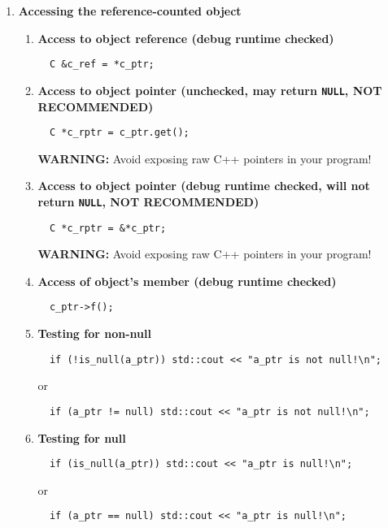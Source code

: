 \documentclass[pdf,ps2pdf,11pt]{SANDreport}
\begin{document}
\begin{enumerate}
\item {\bf Accessing the reference-counted object}
%
\begin{enumerate}
%
\item {\bf Access to object reference (debug runtime checked)}
%
{\small\begin{verbatim}
  C &c_ref = *c_ptr;
\end{verbatim}}
%
\item {\bf Access to object pointer (unchecked, may return \texttt{NULL}, NOT RECOMMENDED)}
%
{\small\begin{verbatim}
  C *c_rptr = c_ptr.get();
\end{verbatim}}
{}\textbf{WARNING:} Avoid exposing raw C++ pointers in your program!
%
\item {\bf Access to object pointer (debug runtime checked, will not return \texttt{NULL}, NOT RECOMMENDED)}
%
{\small\begin{verbatim}
  C *c_rptr = &*c_ptr;
\end{verbatim}}
{}\textbf{WARNING:} Avoid exposing raw C++ pointers in your program!
%
\item {\bf Access of object's member (debug runtime checked)}
%
{\small\begin{verbatim}
  c_ptr->f();
\end{verbatim}}
%
\item {\bf Testing for non-null}
%
{\small\begin{verbatim}
  if (!is_null(a_ptr)) std::cout << "a_ptr is not null!\n";
\end{verbatim}}
%
or
%
{\small\begin{verbatim}
  if (a_ptr != null) std::cout << "a_ptr is not null!\n";
\end{verbatim}}
%
\item {\bf Testing for null}
%
{\small\begin{verbatim}
  if (is_null(a_ptr)) std::cout << "a_ptr is null!\n";
\end{verbatim}}
%
or
%
{\small\begin{verbatim}
  if (a_ptr == null) std::cout << "a_ptr is null!\n";
\end{verbatim}}

%
\end{enumerate}


\end{enumerate}
\end{document}
